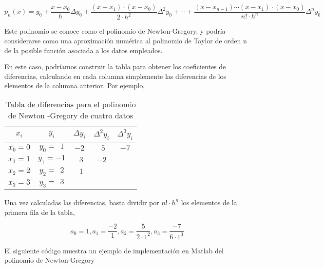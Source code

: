 \begin{equation*}
p_n(x)=y_0+\frac{x-x_0}{h}\Delta y_0+\frac{(x-x_1)\cdot (x-x_0)}{2\cdot h^2}\Delta^2 y_0+\cdots +\frac{(x-x_{n-1}) \cdots (x-x_1)\cdot (x-x_0)}{n! \cdot h^n}\Delta^n y_0
\end{equation*}

Este polinomio se conoce como el polinomio de Newton-Gregory, y podría considerarse como una aproximación  numérica al polinomio de Taylor de orden n de la posible función asociada a los datos empleados. 

En este caso, podríamos construir la tabla para obtener los coeficientes de diferencias, calculando en cada columna simplemente las diferencias de los elementos de la columna anterior. Por ejemplo,

\begin{table}[h]
\centering
\caption{Tabla de diferencias para el polinomio de Newton -Gregory de cuatro datos}
\begin{tabular}{ccccc}
$x_i$&$y_i$&$\Delta y_i$&$\Delta^2 y_i$&$\Delta^3 y_i$\\
\hline
$x_0=0$&$y_0=\ \  1$&$-2$&$\ \ 5$&$-7$\\
$x_1=1$&$y_1=-1$&$ \ \ 3$&$ -2$\\
$x_2=2$&$y_2=\ \ 2$&$\ \ 1$\\
$x_3=3$&$y_3=\ \ 3$\\

\end{tabular}
\label{tabnewton}
\end{table}

Una vez calculadas las diferencias, basta dividir por $n!\cdot h^n$ los elementos de la primera fila de la tabla,

\begin{equation*}
a_0=1, a_1=\frac{-2}{1}, a_2=\frac{5}{2\cdot 1^2}, a_3=\frac{-7}{6\cdot 1^3}
\end{equation*}

El siguiente código muestra un ejemplo de implementación en Matlab del polinomio de Newton-Gregory

